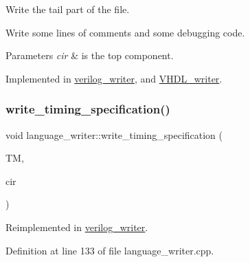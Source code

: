 Write the tail part of the file. 

Write some lines of comments and some debugging code. 
\begin{DoxyParams}{Parameters}
{\em cir} & is the top component. \\
\hline
\end{DoxyParams}


Implemented in \hyperlink{classverilog__writer_ab65a214d6736e0fa5de6f2d5d085227f}{verilog\+\_\+writer}, and \hyperlink{structVHDL__writer_aaba770cf999a1be1ead3e65623adc02f}{V\+H\+D\+L\+\_\+writer}.

\mbox{\label{classlanguage__writer_acbb595dd221844492946d60b79c00185}} 
\subsubsection{\texorpdfstring{write\+\_\+timing\+\_\+specification()}{write\_timing\_specification()}}
{\footnotesize\ttfamily void language\+\_\+writer\+::write\+\_\+timing\+\_\+specification (\begin{DoxyParamCaption}\item[{const technology\+\_\+manager\+Const\+Ref}]{TM,  }\item[{const \hyperlink{structural__objects_8hpp_a8ea5f8cc50ab8f4c31e2751074ff60b2}{structural\+\_\+object\+Ref} \&}]{cir }\end{DoxyParamCaption})\hspace{0.3cm}{\ttfamily [virtual]}}



Reimplemented in \hyperlink{classverilog__writer_a19adf1be19b905787d523ecbf8e654aa}{verilog\+\_\+writer}.



Definition at line 133 of file language\+\_\+writer.\+cpp.

\mbox{\label{classlanguage__writer_a1eb41e600406aea66d35f6da5ef16098}} 
